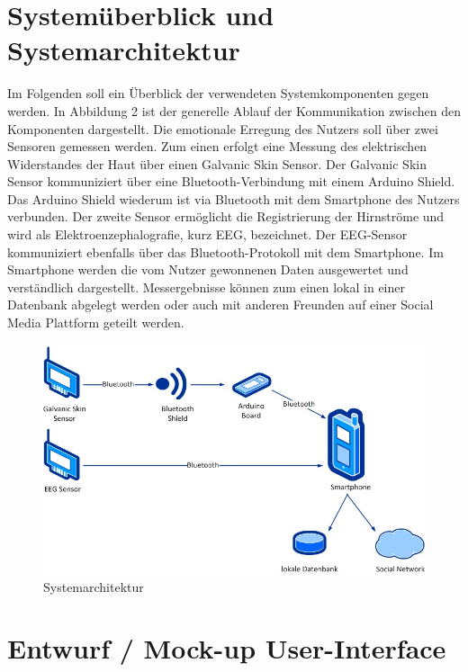 \documentclass[10pt, a4paper, oneside, titlepage]{scrartcl} %
\begin{document}
   \newpage
   \section{Systemüberblick und Systemarchitektur}
   Im Folgenden soll ein Überblick der verwendeten Systemkomponenten gegen werden. In Abbildung 2 ist der generelle Ablauf der Kommunikation zwischen den Komponenten dargestellt. Die emotionale Erregung des Nutzers soll über zwei Sensoren gemessen werden. Zum einen erfolgt eine Messung des elektrischen Widerstandes der Haut über einen Galvanic Skin Sensor. Der Galvanic Skin Sensor kommuniziert über eine Bluetooth-Verbindung mit einem Arduino Shield. Das Arduino Shield wiederum ist via Bluetooth mit dem Smartphone des Nutzers verbunden. Der zweite Sensor ermöglicht die Registrierung der Hirnströme und wird als  Elektroenzephalografie, kurz EEG, bezeichnet. Der EEG-Sensor kommuniziert ebenfalls über das Bluetooth-Protokoll mit dem Smartphone. Im Smartphone werden die vom Nutzer gewonnenen Daten ausgewertet und verständlich dargestellt. Messergebnisse können zum einen lokal in einer Datenbank abgelegt werden oder auch mit anderen Freunden auf einer Social Media Plattform geteilt werden.
   	\begin{figure}[ht!]
		\begin{center}
			\includegraphics[scale=0.6]{systemarchitektur_01.jpg}
		\end{center}
		\caption[Systemarchitektur]{Systemarchitektur}
		\label{fig:system1}
	\end{figure}	
	
	
   	\section{Entwurf / Mock-up User-Interface}
\end{document}
